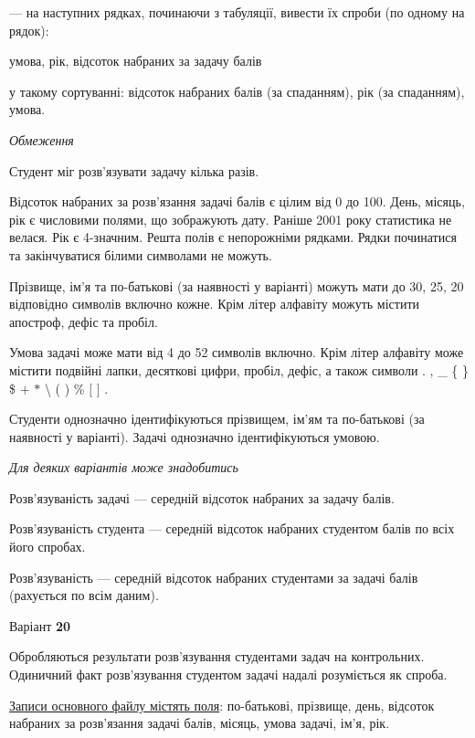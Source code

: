 \documentclass[11pt, ukrainian]{article}
\begin{document}
{\noindent}--- на наступних рядках, починаючи з табуляції, вивести їх спроби (по одному на рядок):\par
умова, рік, відсоток набраних за задачу балів

{\noindent}у такому сортуванні: відсоток набраних балів (за спаданням), рік (за спаданням), умова.


\bigskip\textit{Обмеження}

Студент міг розв’язувати задачу кілька разів.

Відсоток набраних за розв’язання задачі балів є цілим від 0 до 100.
День, місяць, рік є числовими полями, що зображують дату.
Раніше 2001 року статистика не велася. Рік є 4-значним.
Решта полів є непорожніми рядками.
Рядки починатися та закінчуватися білими символами не можуть.

Прізвище, ім’я та по-батькові (за наявності у варіанті) можуть мати до 30, 25, 20 відповідно символів включно кожне. 
Крім літер алфавіту можуть містити апостроф, дефіс та пробіл.

Умова задачі може мати від 4 до 52 символів включно.
Крім літер алфавіту може містити подвійні лапки, десяткові цифри, пробіл, дефіс,
а також символи . , \_ \{ \} \$ $+$ $*$ {\textbackslash} ( ) \% $[$ $]$ .

Студенти однозначно ідентифікуються прізвищем, ім’ям та по-батькові (за наявності у варіанті).
Задачі однозначно ідентифікуються умовою.

\bigskip\textit{Для деяких варіантів може знадобитись}

Розв'язуваність задачі --- середній відсоток набраних за задачу балів.

Розв'язуваність студента --- середній відсоток набраних студентом балів по всіх його спробах.

Розв'язуваність --- середній відсоток набраних студентами за задачі балів (рахується по всім даним).




\par
\newpage
{\center Варіант  \No \textbf { 20 }\par}
\bigskip
Обробляються результати розв’язування студентами задач на контрольних.
Одиничний факт роз\-в’я\-зу\-вання студентом задачі надалі розуміється як спроба.

\underline{Записи основного файлу містять поля}: по-батькові, прізвище, день, відсоток набраних за розв’язан\-ня задачі балів, місяць, умова задачі, ім’я, рік.
\end{document}
